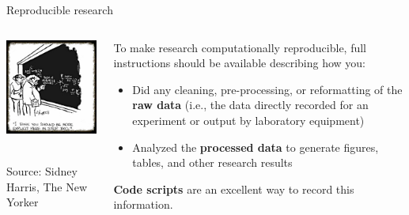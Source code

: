 \documentclass[ignorenonframetext,]{beamer}
\begin{document}
\begin{frame}{Reproducible research}
\protect\hypertarget{reproducible-research-1}{}

\begin{columns}

\begin{column}{0.5\textwidth}
\begin{centering}
\includegraphics[width=\textwidth]{figures/sidney_harris_new_yorker.png}
\end{centering} \\
\vspace{-0.1cm}
\scriptsize Source: Sidney Harris, The New Yorker
\end{column}

\begin{column}{0.5\textwidth}
\small
To make research computationally reproducible, full instructions should be available describing how you: 

\begin{itemize}
\item Did any cleaning, pre-processing, or reformatting of the \textbf{raw data} (i.e., the data directly recorded for an experiment or output by laboratory equipment)
\item Analyzed the \textbf{processed data} to generate figures, tables, and other research results
\end{itemize}

\textbf{Code scripts} are an excellent way to record this information.

\end{column}

\end{columns}

\end{frame}
\end{document}
